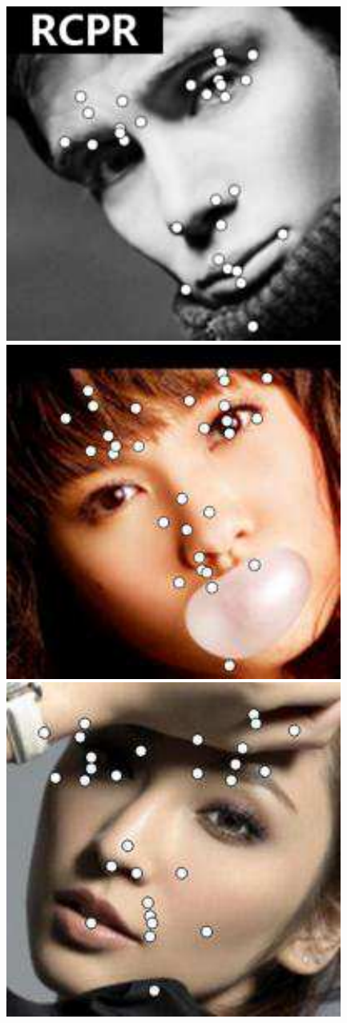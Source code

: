 \documentclass[journal]{IEEEtran}
\begin{document}
\begin{figure}[!htb]
{\begin{minipage}[b]{0.38\textwidth}
\includegraphics[scale=0.22]{29_RCPR_133}
\includegraphics[scale=0.22]{29_RCPR_264}
\includegraphics[scale=0.22]{29_RCPR_150}

\end{minipage}}
\end{figure}
\end{document}
